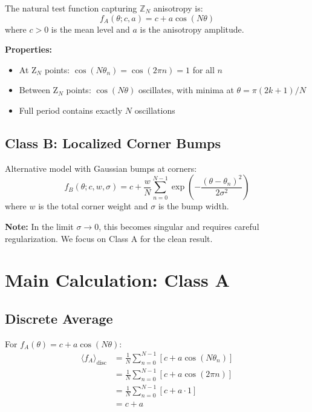 \documentclass[11pt]{article}
\begin{document}
The natural test function capturing $\mathbb{Z}_N$ anisotropy is:
\begin{equation}
\label{eq:test-function-A}
f_A(\theta; c, a) = c + a \cos(N\theta)
\end{equation}
where $c > 0$ is the mean level and $a$ is the anisotropy amplitude.

\textbf{Properties:}
\begin{itemize}
\item At Z$_N$ points: $\cos(N\theta_n) = \cos(2\pi n) = 1$ for all $n$
\item Between Z$_N$ points: $\cos(N\theta)$ oscillates, with minima at $\theta = \pi(2k+1)/N$
\item Full period contains exactly $N$ oscillations
\end{itemize}

\subsection{Class B: Localized Corner Bumps}

Alternative model with Gaussian bumps at corners:
\begin{equation}
\label{eq:test-function-B}
f_B(\theta; c, w, \sigma) = c + \frac{w}{N} \sum_{n=0}^{N-1} \exp\left(-\frac{(\theta - \theta_n)^2}{2\sigma^2}\right)
\end{equation}
where $w$ is the total corner weight and $\sigma$ is the bump width.

\textbf{Note:} In the limit $\sigma \to 0$, this becomes singular and requires careful regularization. We focus on Class A for the clean result.

\section{Main Calculation: Class A}

\subsection{Discrete Average}

For $f_A(\theta) = c + a\cos(N\theta)$:
\begin{align}
\langle f_A \rangle_{\text{disc}} &= \frac{1}{N} \sum_{n=0}^{N-1} \left[c + a\cos(N\theta_n)\right] \\
&= \frac{1}{N} \sum_{n=0}^{N-1} \left[c + a\cos(2\pi n)\right] \\
&= \frac{1}{N} \sum_{n=0}^{N-1} \left[c + a \cdot 1\right] \\
&= c + a
\end{align}
\end{document}

